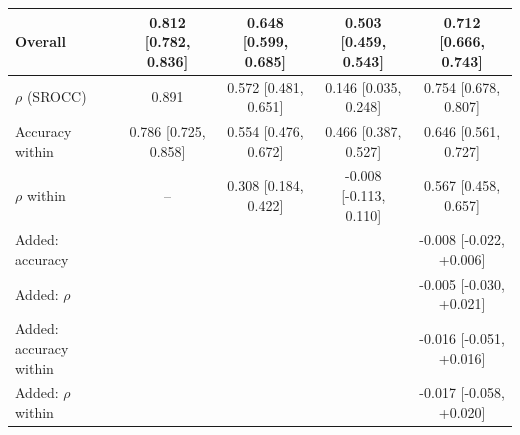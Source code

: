 \begin{table}[htbp]
\begin{tabular}{lcccc}
    \midrule
    Overall & 0.812 [0.782, 0.836] & 0.648 [0.599, 0.685] & 0.503 [0.459, 0.543] & 0.712 [0.666, 0.743] \\
    \midrule
    $\rho$ (SROCC) & 0.891 & 0.572 [0.481, 0.651] & 0.146 [0.035, 0.248] & 0.754 [0.678, 0.807] \\
    \midrule
    Accuracy within & 0.786 [0.725, 0.858] & 0.554 [0.476, 0.672] & 0.466 [0.387, 0.527] & 0.646 [0.561, 0.727] \\
    $\rho$ within & -- & 0.308 [0.184, 0.422] & -0.008 [-0.113, 0.110] & 0.567 [0.458, 0.657] \\
    \midrule
    Added: accuracy &  &  &  & -0.008 [-0.022, +0.006] \\
    Added: $\rho$ &  &  &  & -0.005 [-0.030, +0.021] \\
    Added: accuracy within &  &  &  & -0.016 [-0.051, +0.016] \\
    Added: $\rho$ within &  &  &  & -0.017 [-0.058, +0.020] \\
    \bottomrule
  \end{tabular}
\end{table}
